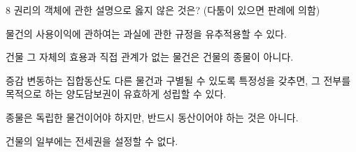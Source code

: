 \begin{question}{8}
권리의 객체에 관한 설명으로 옳지 않은 것은? (다툼이 있으면 판례에 의함)
\begin{choices}
  \item 물건의 사용이익에 관하여는 과실에 관한 규정을 유추적용할 수 있다.
  \item 건물 그 자체의 효용과 직접 관계가 없는 물건은 건물의 종물이 아니다.
  \item 증감 변동하는 집합동산도 다른 물건과 구별될 수 있도록 특정성을 갖추면, 그 전부를 목적으로 하는 양도담보권이 유효하게 성립할 수 있다.
  \item 종물은 독립한 물건이어야 하지만, 반드시 동산이어야 하는 것은 아니다.
  \item 건물의 일부에는 전세권을 설정할 수 없다.
\end{choices}
\end{question}
